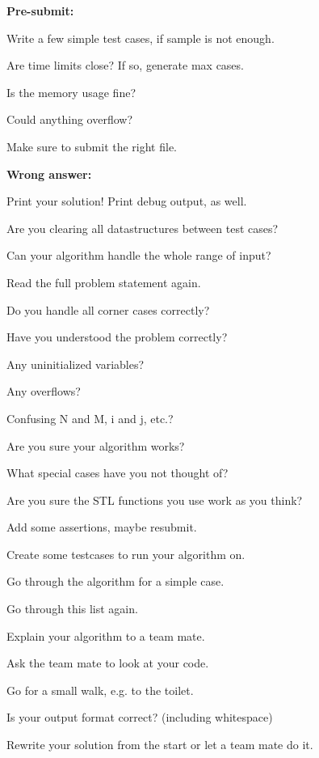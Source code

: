 \textbf{Pre-submit:}
\begin{myitemize}
	\item Write a few simple test cases, if sample is not enough.
	\item Are time limits close? If so, generate max cases.
	\item Is the memory usage fine?
	\item Could anything overflow?
	\item Make sure to submit the right file.
\end{myitemize}

\textbf{Wrong answer:}
\begin{myitemize}
	\item Print your solution! Print debug output, as well.
	\item Are you clearing all datastructures between test cases?
	\item Can your algorithm handle the whole range of input?
	\item Read the full problem statement again.
	\item Do you handle all corner cases correctly?
	\item Have you understood the problem correctly?
	\item Any uninitialized variables?
	\item Any overflows?
	\item Confusing N and M, i and j, etc.?
	\item Are you sure your algorithm works?
	\item What special cases have you not thought of?
	\item Are you sure the STL functions you use work as you think?
	\item Add some assertions, maybe resubmit.
	\item Create some testcases to run your algorithm on.
	\item Go through the algorithm for a simple case.
	\item Go through this list again.
	\item Explain your algorithm to a team mate.
	\item Ask the team mate to look at your code.
	\item Go for a small walk, e.g. to the toilet.
	\item Is your output format correct? (including whitespace)
	\item Rewrite your solution from the start or let a team mate do it.
\end{myitemize}

